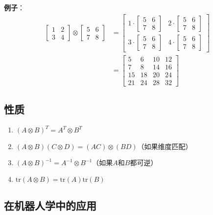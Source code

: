 \documentclass[12pt,a4paper]{article}
\begin{document}
\textbf{例子}：
\begin{align}
\begin{bmatrix} 1 & 2 \\ 3 & 4 \end{bmatrix} \otimes \begin{bmatrix} 5 & 6 \\ 7 & 8 \end{bmatrix} &= \begin{bmatrix} 
1 \cdot \begin{bmatrix} 5 & 6 \\ 7 & 8 \end{bmatrix} & 2 \cdot \begin{bmatrix} 5 & 6 \\ 7 & 8 \end{bmatrix} \\
3 \cdot \begin{bmatrix} 5 & 6 \\ 7 & 8 \end{bmatrix} & 4 \cdot \begin{bmatrix} 5 & 6 \\ 7 & 8 \end{bmatrix}
\end{bmatrix} \\
&= \begin{bmatrix} 5 & 6 & 10 & 12 \\ 7 & 8 & 14 & 16 \\ 15 & 18 & 20 & 24 \\ 21 & 24 & 28 & 32 \end{bmatrix}
\end{align}

\subsection{性质}

\begin{enumerate}
\item $(A \otimes B)^T = A^T \otimes B^T$
\item $(A \otimes B)(C \otimes D) = (AC) \otimes (BD)$（如果维度匹配）
\item $(A \otimes B)^{-1} = A^{-1} \otimes B^{-1}$（如果$A$和$B$都可逆）
\item $\text{tr}(A \otimes B) = \text{tr}(A) \text{tr}(B)$
\end{enumerate}

\subsection{在机器人学中的应用}
\end{document}
